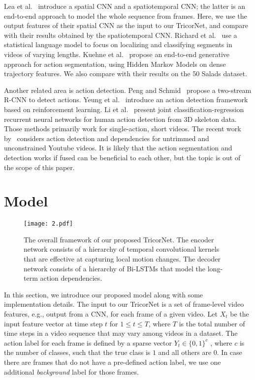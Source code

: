 \documentclass{article}
\begin{document}
Lea et al.~\cite{scnn} introduce a spatial CNN and a spatiotemporal CNN; the latter is an end-to-end approach to model the whole sequence from frames. Here, we use the output features of their spatial CNN as the input to our TricorNet, and compare with their results obtained by the spatiotemporal CNN. Richard et al.~\cite{richard} use a statistical language model to focus on localizing and classifying segments in videos of varying lengths. Kuehne et al.~\cite{kuehne} propose an end-to-end generative approach for action segmentation, using Hidden Markov Models on dense trajectory features. We also compare with their results on the 50 Salads dataset. 

Another related area is action detection. Peng and Schmid~\cite{PeScECCV2016} propose a two-stream R-CNN to detect actions. Yeung et al.~\cite{YeRuMoCVPR2016} introduce an action detection framework based on reinforcement learning. Li et al.~\cite{LiLaXiECCV2016} present joint classification-regression recurrent neural networks for human action detection from 3D skeleton data. Those methods primarily work for single-action, short videos. The recent work by~\cite{ZhXuCoARXIV2017} considers action detection and dependencies for untrimmed and unconstrained Youtube videos. It is likely that the action segmentation and detection works if fused can be beneficial to each other, but the topic is out of the scope of this paper.

\section{Model}
\label{sec:model}

\begin{figure}[t]
\centering
\texttt{[image: 2.pdf]}
\caption{The overall framework of our proposed TricorNet. The encoder network consists of a hierarchy of temporal convolutional kernels that are effective at capturing local motion changes. The decoder network consists of a hierarchy of Bi-LSTMs that model the long-term action dependencies.}
\label{f2}
\end{figure}

In this section, we introduce our proposed model along with some implementation details. The input to our TricorNet is a set of frame-level video features, e.g., output from a CNN, for each frame of a given video. Let $X_t$ be the input feature vector at time step $t$ for $1 \leq t \leq T$, where $T$ is the total number of time steps in a video sequence that may vary among videos in a dataset. The action label for each frame is defined by a sparse vector $Y_t \in \{0, 1\}^c$ , where $c$ is the number of classes, such that the true class is $1$ and all others are $0$. In case there are frames that do not have a pre-defined action label, we use one additional \textit{background} label for those frames.
\end{document}
